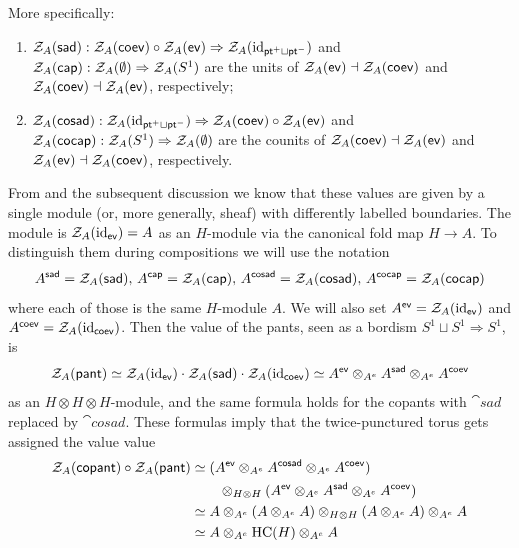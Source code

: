 More specifically:
\begin{enumerate}
	\item[($\eta$)] $\mathcal{Z}_A(\mathsf{sad}) : \mathcal{Z}_A(\mathsf{coev}) \circ \mathcal{Z}_A(\mathsf{ev}) \Rightarrow \mathcal{Z}_A(\mathrm{id}_{\mathsf{pt}^+ \sqcup \mathsf{pt}^-})$ and $\mathcal{Z}_A(\mathsf{cap}) : \mathcal{Z}_A(\emptyset) \Rightarrow \mathcal{Z}_A(S^1)$ are the units of $\mathcal{Z}_A(\mathsf{ev}) \dashv \mathcal{Z}_A(\mathsf{coev})$ and $\mathcal{Z}_A(\mathsf{coev}) \dashv \mathcal{Z}_A(\mathsf{ev})$, respectively;
	\item[($\veps$)] $\mathcal{Z}_A(\mathsf{cosad}) : \mathcal{Z}_A(\mathrm{id}_{\mathsf{pt}^+ \sqcup \mathsf{pt}^-}) \Rightarrow \mathcal{Z}_A(\mathsf{coev}) \circ \mathcal{Z}_A(\mathsf{ev})$ and $\mathcal{Z}_A(\mathsf{cocap}) : \mathcal{Z}_A(S^1) \Rightarrow \mathcal{Z}_A(\emptyset)$ are the counits of $\mathcal{Z}_A(\mathsf{coev}) \dashv \mathcal{Z}_A(\mathsf{ev})$ and $\mathcal{Z}_A(\mathsf{ev}) \dashv \mathcal{Z}_A(\mathsf{coev})$, respectively.
\end{enumerate}
From  and the subsequent discussion we know that these values are given by a single module (or, more generally, sheaf) with differently labelled boundaries. The module is $\mathcal{Z}_A(\mathrm{id}_{\mathsf{ev}}) = A$ as an $H$-module via the canonical fold map $H \to A$. To distinguish them during compositions we will use the notation
\begin{equation*}
	A^{\mathsf{sad}} = \mathcal{Z}_A(\mathsf{sad}), \, A^{\mathsf{cap}} = \mathcal{Z}_A(\mathsf{cap}), \,  A^{\mathsf{cosad}} = \mathcal{Z}_A(\mathsf{cosad}), \, A^{\mathsf{cocap}} = \mathcal{Z}_A(\mathsf{cocap})
\end{equation*}
where each of those is the same $H$-module $A$. We will also set $A^{\mathsf{ev}} = \mathcal{Z}_A(\mathrm{id}_{\mathsf{ev}})$ and $A^{\mathsf{coev}} = \mathcal{Z}_A(\mathrm{id}_{\mathsf{coev}})$. Then the value of the pants, seen as a bordism $S^1 \sqcup S^1 \Rightarrow S^1$, is
\begin{equation*}
	\mathcal{Z}_A(\mathsf{pant}) \simeq \mathcal{Z}_A(\mathrm{id}_{\mathsf{ev}}) \cdot \mathcal{Z}_A(\mathsf{sad}) \cdot \mathcal{Z}_A(\mathrm{id}_{\mathsf{coev}}) \simeq A^{\mathsf{ev}} \otimes_{A^e} A^{\mathsf{sad}} \otimes_{A^e} A^{\mathsf{coev}}
\end{equation*}
as an $H \otimes H \otimes H$-module, and the same formula holds for the copants with $\cat{sad}$ replaced by $\cat{cosad}$. These formulas imply that the twice-punctured torus gets assigned the value value
\begin{align*}
	\mathcal{Z}_A(\mathsf{copant}) \circ \mathcal{Z}_A(\mathsf{pant}) & \simeq (A^{\mathsf{ev}} \otimes_{A^e} A^{\mathsf{cosad}} \otimes_{A^e} A^{\mathsf{coev}}) \\
	& \qquad \otimes_{H \otimes H} (A^{\mathsf{ev}} \otimes_{A^e} A^{\mathsf{sad}} \otimes_{A^e} A^{\mathsf{coev}}) \\
	& \simeq A \otimes_{A^e} (A \otimes_{A^e} A) \otimes_{H \otimes H} (A \otimes_{A^e} A) \otimes_{A^e} A \\
	& \simeq A \otimes_{A^e} \mathrm{HC}(H) \otimes_{A^e} A
\end{align*}
